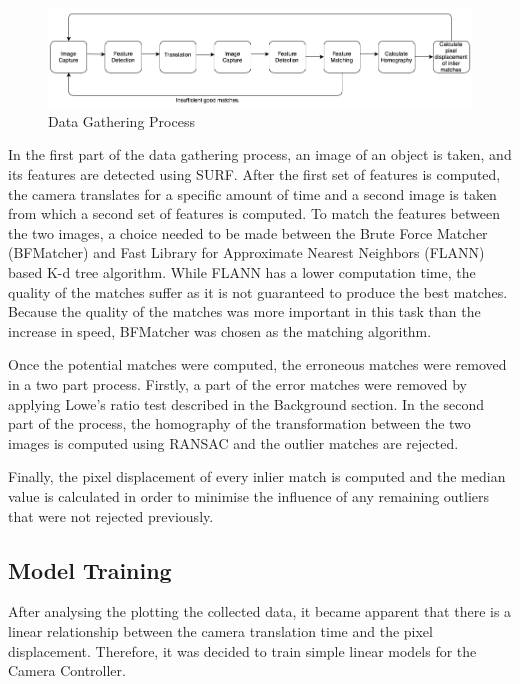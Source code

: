\documentclass{l4proj}
\begin{document}
\begin{figure}[ht]
    \centering
    \includegraphics[width=1\textwidth]{l4template-master/images/dataGathering.png}
    \caption{Data Gathering Process}
    \label{datagathering}
\end{figure}


In the first part of the data gathering process, an image of an object is taken, and its features are detected using SURF. After the first set of features is computed, the camera translates for a specific amount of time and a second image is taken from which a second set of features is computed. To match the features between the two images, a choice needed to be made between the Brute Force Matcher (BFMatcher) and Fast Library for Approximate Nearest Neighbors (FLANN) based K-d tree algorithm. While FLANN has a lower computation time, the quality of the matches suffer as it is not guaranteed to produce the best matches. Because the quality of the matches was more important in this task than the increase in speed, BFMatcher was chosen as the matching algorithm. 

Once the potential matches were computed, the erroneous matches were removed in a two part process. Firstly, a part of the error matches were removed by applying Lowe's ratio test described in the Background section. In the second part of the process, the homography of the transformation between the two images is computed using RANSAC and the outlier matches are rejected. 

Finally, the pixel displacement of every inlier match is computed and the median value is calculated in order to minimise the influence of any remaining outliers that were not rejected previously.  


\subsection{Model Training}

After analysing the plotting the collected data, it became apparent that there is a linear relationship between the camera translation time and the pixel displacement. Therefore, it was decided to train simple linear models for the Camera Controller. 
\end{document}
